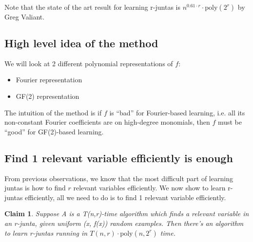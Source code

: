 \documentclass[12pt]{article}
\newtheorem{claim}[theorem]{Claim}
\newcommand{\poly}{\mathrm{poly}}
\begin{document}
Note that the state of the art result for learning r-juntas is
$n^{0.61 \cdot r} \cdot \poly(2^r)$ by Greg Valiant. 

\subsection{High level idea of the method}

We will look at 2 different polynomial representations of $f$:

\begin{itemize}
\item Fourier representation
\item GF(2) representation
\end{itemize}

The intuition of the method is if $f$ is ``bad'' for Fourier-based
learning, i.e. all its non-constant Fourier coefficients are on
high-degree monomials, then $f$ must be ``good'' for GF(2)-based
learning.

\subsection{Find 1 relevant variable efficiently is enough}

From previous observations, we know that the most difficult part of
learning juntas is how to find $r$ relevant variables efficiently. We
now show to learn r-juntas efficiently, all we need to do is to find 1
relevant variable efficiently.

\begin{claim}
Suppose A is a T(n,r)-time algorithm which finds a relevant variable
in an r-junta, given uniform (x, f(x)) random examples. Then there's
an algorithm to learn r-juntas running in $T(n,r) \cdot \poly (n,
2^r)$ time.
\end{claim}
\end{document}
